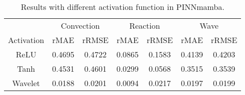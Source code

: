 \begin{table}[H]
\vspace{-3mm}
  \caption{Results with different activation function in PINNmamba.}
  
  \centering
    \small
  \begin{tabular}{c|cc|cc|cc}

    \toprule 
      &\multicolumn{2}{c}{Convection }&\multicolumn{2}{c}{Reaction}&\multicolumn{2}{c}{Wave}\\
    \cmidrule(lr){2-3}\cmidrule(lr){4-5}\cmidrule(lr){6-7}
   Activation & rMAE & rRMSE & rMAE & rRMSE & rMAE & rRMSE\\
   \midrule
   ReLU & 0.4695& 0.4722 & 0.0865 & 0.1583 &0.4139 &0.4203  \\
 Tanh & 0.4531& 0.4601& 0.0299 & 0.0568  & 0.3515 & 0.3539  \\
Wavelet &0.0188 & 0.0201 &0.0094 &0.0217 & 0.0197 &  0.0199\\


    

   

    \bottomrule
  \end{tabular}
  \normalsize
  \label{tab:activation}

\end{table}